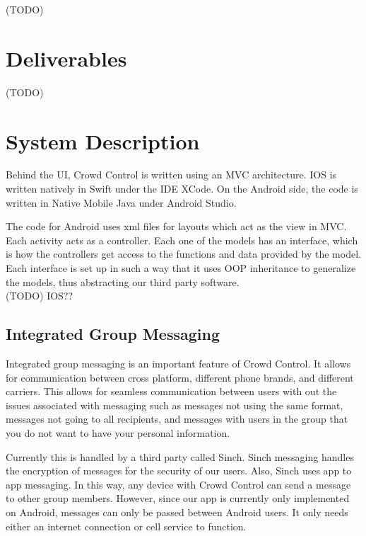 (TODO)

\section{Deliverables}

(TODO)

\section{System Description}
Behind the UI, Crowd Control is written using an MVC architecture. IOS is written natively in Swift under the IDE XCode. On the Android side, the code is written in Native Mobile Java under Android Studio.

The code for Android uses xml files for layouts which act as the view in MVC. Each activity acts as a controller. Each one of the models has an interface, which is how the controllers get access to the functions and data provided by the model. Each interface is set up in such a way that it uses OOP inheritance to generalize the models, thus abstracting our third party software.\\

(TODO) IOS??

\subsection{Integrated Group Messaging}
Integrated group messaging is an important feature of Crowd Control. It allows for communication between cross platform, different phone brands, and different carriers. This allows for seamless communication between users with out the issues associated with messaging such as messages not using the same format, messages not going to all recipients, and messages with users in the group that you do not want to have your personal information.

Currently this is handled by a third party called Sinch. Sinch messaging handles the encryption of messages for the security of our users. Also, Sinch uses app to app messaging. In this way, any device with Crowd Control can send a message to other group members. However, since our app is currently only implemented on Android, messages can only be passed between Android users. It only needs either an internet connection or cell service to function.

